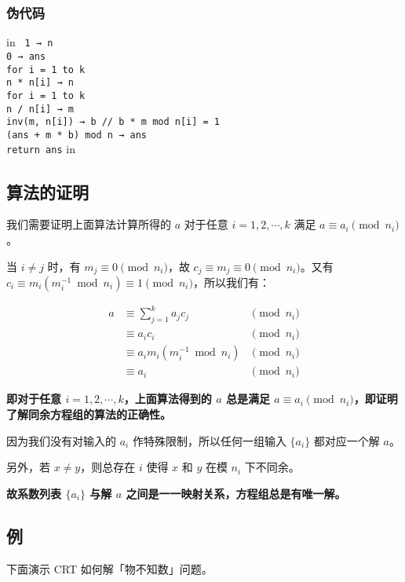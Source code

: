 \subsubsection{伪代码}

 in
\texttt{
1 → n\\0 → ans\\for i = 1 to k\\	n * n[i] → n\\for i = 1 to k\\	n / n[i] → m\\	inv(m, n[i]) → b               // b * m mod n[i] = 1\\	(ans + m * b) mod n → ans\\return ans}
 in

\subsection{算法的证明}

我们需要证明上面算法计算所得的 $a$ 对于任意 $i=1,2,\cdots,k$ 满足 $a\equiv a_i \pmod {n_i}$。

当 $i\neq j$ 时，有 $m_j\equiv 0 \pmod {n_i}$，故 $c_j\equiv m_j\equiv 0 \pmod {n_i}$。又有 $c_i\equiv m_i(m_i^{-1}\bmod {n_i})\equiv 1 \pmod {n_i}$，所以我们有：

$$
\begin{aligned}
a&\equiv \sum_{j=1}^k a_jc_j        &\pmod {n_i} \\
 &\equiv a_ic_i                     &\pmod {n_i} \\
 &\equiv a_im_i(m^{-1}_i \bmod n_i) &\pmod {n_i} \\
 &\equiv a_i                        &\pmod {n_i}
\end{aligned}
$$

\textbf{即对于任意 $i=1,2,\cdots,k$，上面算法得到的 $a$ 总是满足 $a\equiv a_i \pmod{n_i}$，即证明了解同余方程组的算法的正确性。}

因为我们没有对输入的 $a_i$ 作特殊限制，所以任何一组输入 $\{a_i\}$ 都对应一个解 $a$。

另外，若 $x\neq y$，则总存在 $i$ 使得 $x$ 和 $y$ 在模 $n_i$ 下不同余。

\textbf{故系数列表 $\{a_i\}$ 与解 $a$ 之间是一一映射关系，方程组总是有唯一解。}

\subsection{例}

下面演示 CRT 如何解「物不知数」问题。

